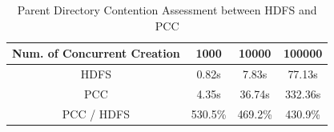 \begin{table}[h]
	\centering
	\begin{tabular}{|c|c|c|c|}
		\hline
		\textbf{Num. of Concurrent Creation} & \textbf{1000} & \textbf{10000} & \textbf{100000} \\ \hline
		HDFS                                 & 0.82s         & 7.83s          & 77.13s          \\ \hline
		PCC                       & 4.35s         & 36.74s         & 332.36s         \\ \hline
		PCC / HDFS                           & 530.5\%       & 469.2\%        & 430.9\%         \\ \hline
	\end{tabular}
		\caption{Parent Directory Contention Assessment between HDFS and PCC}
		\label{table:hdfsPCCparent}
\end{table}